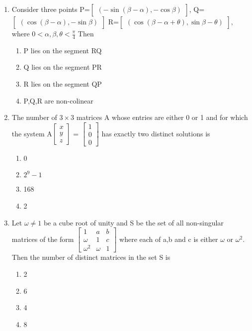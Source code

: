 \begin{enumerate}[label=\arabic*.,ref=\thesubsection.\theenumi]
\item Consider three points  
P=$\begin{bmatrix}(-\sin(\beta-\alpha), -\cos\beta)\end{bmatrix}$, 
Q=$\begin{bmatrix} (\cos(\beta-\alpha), -\sin\beta)\end{bmatrix} $ 
R=$\begin{bmatrix} (\cos(\beta-\alpha+\theta), \sin\beta-\theta)\end{bmatrix},$ 
where $0 < \alpha,\beta,\theta < \frac{\pi}{4}$ Then
\begin{enumerate}
 \item P lies on the segment RQ
 \item Q lies on the segment PR
 \item R lies on the segment QP
 \item P,Q,R are non-colinear
\end{enumerate}
\item The number of $3\times3$ matrices A whose entries are either 0 or 1 and for which the system A$\begin{bmatrix} x \\ y \\  z \end{bmatrix}$ = $\begin{bmatrix} 1 \\ 0 \\  0 \end{bmatrix}$ has exactly two distinct solutions is
\begin{enumerate}
 \item 0
 \item $2^9-1$
 \item 168
 \item 2
\end{enumerate}
\item Let $\omega\neq1$ be a cube root of unity and S be the set of all non-singular matrices of the form  $\begin{bmatrix} 1 & a & b \\ \omega & 1 & c\\  \omega^2 & \omega & 1 \end{bmatrix}$ where each of a,b and c is either $\omega$ or $\omega^2$. Then the number of distinct matrices in the set S is
\begin{enumerate}
 \item 2
 \item 6
 \item 4
 \item 8

\end{enumerate}
\end{enumerate}
